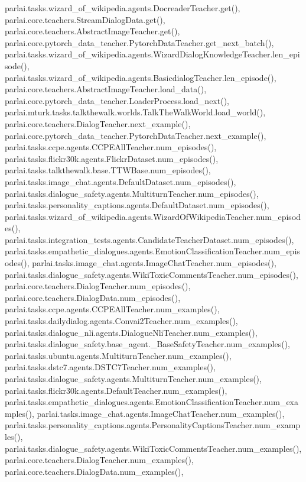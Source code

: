 parlai.\+tasks.\+wizard\+\_\+of\+\_\+wikipedia.\+agents.\+Docreader\+Teacher.\+get(), parlai.\+core.\+teachers.\+Stream\+Dialog\+Data.\+get(), parlai.\+core.\+teachers.\+Abstract\+Image\+Teacher.\+get(), parlai.\+core.\+pytorch\+\_\+data\+\_\+teacher.\+Pytorch\+Data\+Teacher.\+get\+\_\+next\+\_\+batch(), parlai.\+tasks.\+wizard\+\_\+of\+\_\+wikipedia.\+agents.\+Wizard\+Dialog\+Knowledge\+Teacher.\+len\+\_\+episode(), parlai.\+tasks.\+wizard\+\_\+of\+\_\+wikipedia.\+agents.\+Basicdialog\+Teacher.\+len\+\_\+episode(), parlai.\+core.\+teachers.\+Abstract\+Image\+Teacher.\+load\+\_\+data(), parlai.\+core.\+pytorch\+\_\+data\+\_\+teacher.\+Loader\+Process.\+load\+\_\+next(), parlai.\+mturk.\+tasks.\+talkthewalk.\+worlds.\+Talk\+The\+Walk\+World.\+load\+\_\+world(), parlai.\+core.\+teachers.\+Dialog\+Teacher.\+next\+\_\+example(), parlai.\+core.\+pytorch\+\_\+data\+\_\+teacher.\+Pytorch\+Data\+Teacher.\+next\+\_\+example(), parlai.\+tasks.\+ccpe.\+agents.\+C\+C\+P\+E\+All\+Teacher.\+num\+\_\+episodes(), parlai.\+tasks.\+flickr30k.\+agents.\+Flickr\+Dataset.\+num\+\_\+episodes(), parlai.\+tasks.\+talkthewalk.\+base.\+T\+T\+W\+Base.\+num\+\_\+episodes(), parlai.\+tasks.\+image\+\_\+chat.\+agents.\+Default\+Dataset.\+num\+\_\+episodes(), parlai.\+tasks.\+dialogue\+\_\+safety.\+agents.\+Multiturn\+Teacher.\+num\+\_\+episodes(), parlai.\+tasks.\+personality\+\_\+captions.\+agents.\+Default\+Dataset.\+num\+\_\+episodes(), parlai.\+tasks.\+wizard\+\_\+of\+\_\+wikipedia.\+agents.\+Wizard\+Of\+Wikipedia\+Teacher.\+num\+\_\+episodes(), parlai.\+tasks.\+integration\+\_\+tests.\+agents.\+Candidate\+Teacher\+Dataset.\+num\+\_\+episodes(), parlai.\+tasks.\+empathetic\+\_\+dialogues.\+agents.\+Emotion\+Classification\+Teacher.\+num\+\_\+episodes(), parlai.\+tasks.\+image\+\_\+chat.\+agents.\+Image\+Chat\+Teacher.\+num\+\_\+episodes(), parlai.\+tasks.\+dialogue\+\_\+safety.\+agents.\+Wiki\+Toxic\+Comments\+Teacher.\+num\+\_\+episodes(), parlai.\+core.\+teachers.\+Dialog\+Teacher.\+num\+\_\+episodes(), parlai.\+core.\+teachers.\+Dialog\+Data.\+num\+\_\+episodes(), parlai.\+tasks.\+ccpe.\+agents.\+C\+C\+P\+E\+All\+Teacher.\+num\+\_\+examples(), parlai.\+tasks.\+dailydialog.\+agents.\+Convai2\+Teacher.\+num\+\_\+examples(), parlai.\+tasks.\+dialogue\+\_\+nli.\+agents.\+Dialogue\+Nli\+Teacher.\+num\+\_\+examples(), parlai.\+tasks.\+dialogue\+\_\+safety.\+base\+\_\+agent.\+\_\+\+Base\+Safety\+Teacher.\+num\+\_\+examples(), parlai.\+tasks.\+ubuntu.\+agents.\+Multiturn\+Teacher.\+num\+\_\+examples(), parlai.\+tasks.\+dstc7.\+agents.\+D\+S\+T\+C7\+Teacher.\+num\+\_\+examples(), parlai.\+tasks.\+dialogue\+\_\+safety.\+agents.\+Multiturn\+Teacher.\+num\+\_\+examples(), parlai.\+tasks.\+flickr30k.\+agents.\+Default\+Teacher.\+num\+\_\+examples(), parlai.\+tasks.\+empathetic\+\_\+dialogues.\+agents.\+Emotion\+Classification\+Teacher.\+num\+\_\+examples(), parlai.\+tasks.\+image\+\_\+chat.\+agents.\+Image\+Chat\+Teacher.\+num\+\_\+examples(), parlai.\+tasks.\+personality\+\_\+captions.\+agents.\+Personality\+Captions\+Teacher.\+num\+\_\+examples(), parlai.\+tasks.\+dialogue\+\_\+safety.\+agents.\+Wiki\+Toxic\+Comments\+Teacher.\+num\+\_\+examples(), parlai.\+core.\+teachers.\+Dialog\+Teacher.\+num\+\_\+examples(), parlai.\+core.\+teachers.\+Dialog\+Data.\+num\+\_\+examples(), 
